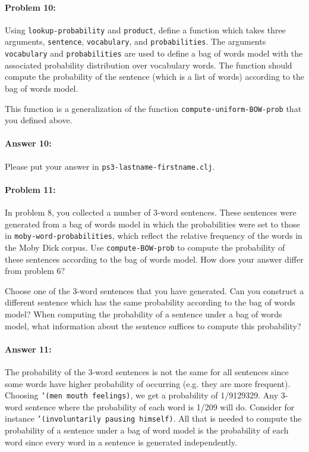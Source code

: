 \documentclass[10pt]{article}
\newcommand{\required}[1]{{\color{blue}{#1}}}
\newcommand{\PSnum}{3}
\begin{document}
\noindent\hrulefill %

\paragraph{Problem 10:}

Using \texttt{lookup-probability} and \texttt{product}, define a
function \required{\texttt{compute-BOW-prob}} which takes three arguments,
\texttt{sentence}, \texttt{vocabulary}, and
\texttt{probabilities}. The arguments \texttt{vocabulary} and
\texttt{probabilities} are used to define a bag of words model with
the associated probability distribution over vocabulary words. The
function should compute the probability of the sentence (which is a
list of words) according to the bag of words model.

This function is a generalization of the function
\texttt{compute-uniform-BOW-prob} that you defined above.

\paragraph{Answer 10:} Please put your answer in
\texttt{ps\PSnum-lastname-firstname.clj}.

\noindent\hrulefill %

\paragraph{Problem 11:}

In problem 8, you collected a number of 3-word sentences. These
sentences were generated from a bag of words model in which the
probabilities were set to those in \texttt{moby-word-probabilities},
which reflect the relative frequency of the words in the Moby Dick
corpus. Use \texttt{compute-BOW-prob} to compute the probability of
these sentences according to the bag of words model. How does your
answer differ from problem 6?

Choose one of the 3-word sentences that you have generated. Can you
construct a different sentence which has the same probability
according to the bag of words model? When computing the probability of
a sentence under a bag of words model, what information about the
sentence suffices to compute this probability?

\paragraph{Answer 11:} The probability of the 3-word sentences is not the same for all sentences since some words have higher probability of occurring (e.g. they are more frequent). Choosing \texttt{'(men mouth feelings)}, we get a probability of 1/9129329. Any 3-word sentence where the probability of each word is 1/209 will do. Consider for instance \texttt{'(involuntarily pausing himself)}. All that is needed to compute the probability of a sentence under a bag of word model is the probability of each word since every word in a sentence is generated independently.
\end{document}
